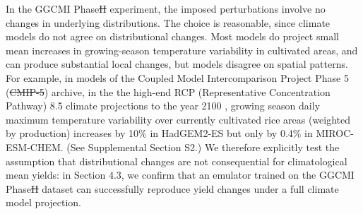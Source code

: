 \documentclass[gmdd]{copernicus} %
\providecommand{\DIFadd}[1]{{\protect\color{blue}\uwave{#1}}} %
\providecommand{\DIFdel}[1]{{\protect\color{red}\sout{#1}}}                      %
\providecommand{\DIFaddbegin}{} %
\providecommand{\DIFaddend}{} %
\providecommand{\DIFdelbegin}{} %
\providecommand{\DIFdelend}{} %
\begin{document}
In the GGCMI Phase\DIFdelbegin \DIFdel{II }\DIFdelend \DIFaddbegin \DIFadd{~2 }\DIFaddend experiment, the imposed perturbations involve no changes in underlying distributions.
The choice is reasonable, since climate models do not agree on distributional changes.
Most models do project small mean increases in growing-season temperature variability in cultivated areas, and can produce substantial local changes, but models disagree on spatial patterns.
For example, in models of the Coupled Model Intercomparison Project Phase 5 (\DIFdelbegin \DIFdel{CMIP-5}\DIFdelend \DIFaddbegin \DIFadd{CMIP5}\DIFaddend ) archive, in the the high-end RCP (Representative Concentration Pathway) 8.5 climate projections to the year 2100 \citep{riahi2011rcp}, growing season daily maximum temperature variability over currently cultivated rice areas (weighted by production) increases by 10\% in HadGEM2-ES but only by 0.4\% in MIROC-ESM-CHEM. (See Supplemental Section S2.)
We therefore explicitly test the assumption that distributional changes are not consequential for climatological mean yields: in Section 4.3, we confirm that an emulator trained on the GGCMI Phase\DIFdelbegin \DIFdel{II }\DIFdelend \DIFaddbegin \DIFadd{~2 }\DIFaddend dataset can successfully reproduce yield changes under a full climate model projection.
\end{document}
